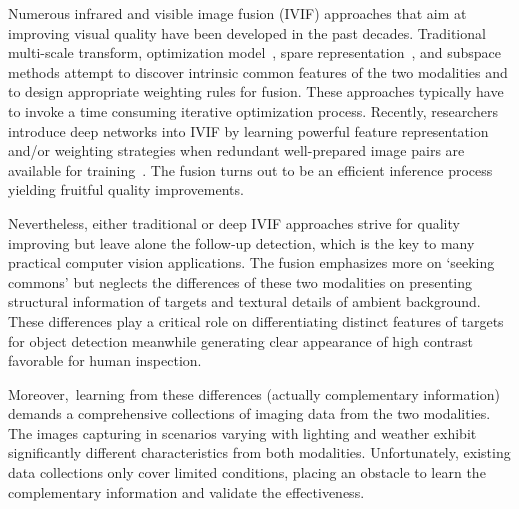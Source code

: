\documentclass[10pt,twocolumn,letterpaper]{article}
\begin{document}
Numerous infrared and visible image fusion (IVIF) approaches that aim at improving visual quality have been developed in the past decades. Traditional multi-scale transform\cite{ma2017infrared,li2013image}, optimization model~\cite{ma2016infrared,zhao2020bayesian,bilevel}, spare representation~\cite{zhang2018sparse,zhu2018novel}, and subspace~ methods attempt to discover intrinsic common features of the two modalities and to design appropriate weighting rules for fusion. These approaches typically have to invoke a time consuming iterative optimization process. Recently, researchers introduce deep networks into IVIF by learning powerful feature representation and/or weighting strategies when redundant well-prepared image pairs are available for training~\cite{ma2019fusiongan,U2Fusion2020,ddcgan,li2018densefuse,MFEIF2021,GANMcC}. The fusion turns out to be an efficient inference process yielding fruitful quality improvements.

Nevertheless, either traditional or deep IVIF approaches strive for quality improving but leave alone the follow-up detection, which is the key to many practical computer vision applications. The fusion emphasizes more on `seeking commons' but neglects the differences of these two modalities on presenting structural information of targets and textural details of ambient background. These differences play a critical role on differentiating distinct features of targets for object detection meanwhile generating clear appearance of high contrast favorable for human inspection.     

Moreover,~learning from these differences (actually complementary information) demands a comprehensive collections of imaging data from the two modalities. The images capturing in scenarios varying with lighting and weather exhibit significantly different characteristics from both modalities. Unfortunately, existing data collections only cover limited conditions, placing an obstacle to learn the complementary information and validate the effectiveness. 
\end{document}

